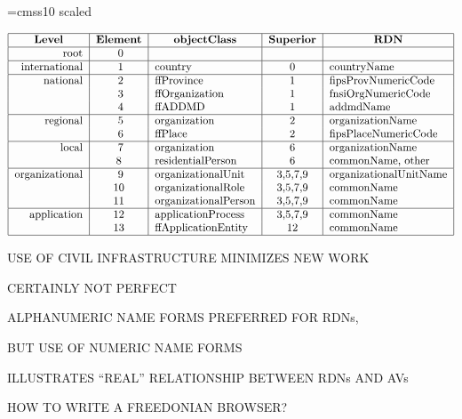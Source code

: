 \begin{bwslide}
\font\twlsf=cmss10 scaled 
\twlsf

\[\begin{tabular}{|r|c|l|c|l|}
\hline
\multicolumn{1}{|c|}{\bf Level}&
\multicolumn{1}{c|}{\bf Element}&
	\multicolumn{1}{c|}{\bf objectClass}&
			\multicolumn{1}{c|}{\bf Superior}&
				\multicolumn{1}{c|}{\bf RDN}\\
\hline
root&
\ 0&	&		&	\\
\hline
international&
\ 1&	country&	0&	countryName\\
\hline
national&
 \ 2&	ffProvince&	1&	fipsProvNumericCode\\
&\ 3&	ffOrganization&	1&	fnsiOrgNumericCode\\
&\ 4&	ffADDMD&	1&	addmdName\\
\hline
regional&
 \ 5&	organization&	2&	organizationName\\
&\ 6&	ffPlace&	2&	fipsPlaceNumericCode\\
\hline
local&
\ 7&	organization&	6&	organizationName\\
& 8&	residentialPerson&
			6&	commonName, other\\
\hline
organizational&
\ 9&	organizationalUnit&
			3,5,7,9&
				organizationalUnitName\\
&10&	organizationalRole&
			3,5,7,9&
				commonName\\
&11&	organizationalPerson&
			3,5,7,9&
				commonName\\
\hline
application&
12&	applicationProcess&
			3,5,7,9&
				commonName\\
&13&	ffApplicationEntity&
			12&	commonName\\
\hline
\end{tabular}\]
\end{bwslide}


\begin{bwslide}

\begin{nrtc}
\item	USE OF CIVIL INFRASTRUCTURE MINIMIZES NEW WORK

\item	CERTAINLY NOT PERFECT

\item	ALPHANUMERIC NAME FORMS PREFERRED FOR RDNs,
    \begin{nrtc}
    \item	BUT USE OF NUMERIC NAME FORMS
    \end{nrtc}
    ILLUSTRATES ``REAL'' RELATIONSHIP BETWEEN RDNs AND AVs

\item	HOW TO WRITE A FREEDONIAN BROWSER?
\end{nrtc}
\end{bwslide}


